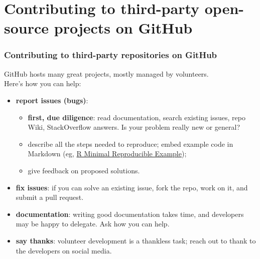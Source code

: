 \documentclass[10pt,svgnames]{beamer}
\begin{document}
\section{Contributing to third-party open-source projects on GitHub}
\begin{frame}
\frametitle{Contributing to third-party repositories on GitHub}
GitHub hosts many great projects, mostly managed by volunteers. \\
\medskip
\pause
Here's how you can help:
\begin{itemize}[<+->]
\item \textbf{report issues (bugs)}: 
\begin{itemize}
  \item \textbf{first, due diligence}: read documentation, search existing issues, repo Wiki, StackOverflow answers. Is your problem really new or general?
  \item describe all the steps needed to reproduce; embed example code in Markdown (eg, \href{https://stackoverflow.com/questions/5963269/how-to-make-a-great-r-reproducible-example}{R Minimal Reproducible Example});
  \item give feedback on proposed solutions.
\end{itemize}
\item \textbf{fix issues}: if you can solve an existing issue, fork the repo, work on it, and submit a pull request.
\item \textbf{documentation}: writing good documentation takes time, and developers may be happy to delegate. Ask how you can help.
\item \textbf{say thanks}: volunteer development is a thankless task; reach out to thank to the developers on social media.
\end{itemize}
\end{frame}
\end{document}
